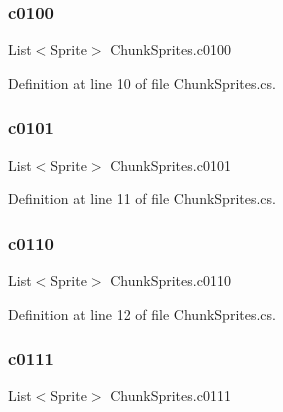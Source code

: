 \mbox{\label{class_chunk_sprites_a42214aec09db89ee79e62dc41f81e6b3}} 
\subsubsection{\texorpdfstring{c0100}{c0100}}
{\footnotesize\ttfamily List$<$Sprite$>$ Chunk\+Sprites.\+c0100}



Definition at line 10 of file Chunk\+Sprites.\+cs.

\mbox{\label{class_chunk_sprites_a81c9de1dbe228e43506ff51f841c2166}} 
\subsubsection{\texorpdfstring{c0101}{c0101}}
{\footnotesize\ttfamily List$<$Sprite$>$ Chunk\+Sprites.\+c0101}



Definition at line 11 of file Chunk\+Sprites.\+cs.

\mbox{\label{class_chunk_sprites_a4b155b738bb5ebc714e8eafa07e29a56}} 
\subsubsection{\texorpdfstring{c0110}{c0110}}
{\footnotesize\ttfamily List$<$Sprite$>$ Chunk\+Sprites.\+c0110}



Definition at line 12 of file Chunk\+Sprites.\+cs.

\mbox{\label{class_chunk_sprites_a9f5b86d62261861f42e6b4654a5f106c}} 
\subsubsection{\texorpdfstring{c0111}{c0111}}
{\footnotesize\ttfamily List$<$Sprite$>$ Chunk\+Sprites.\+c0111}



